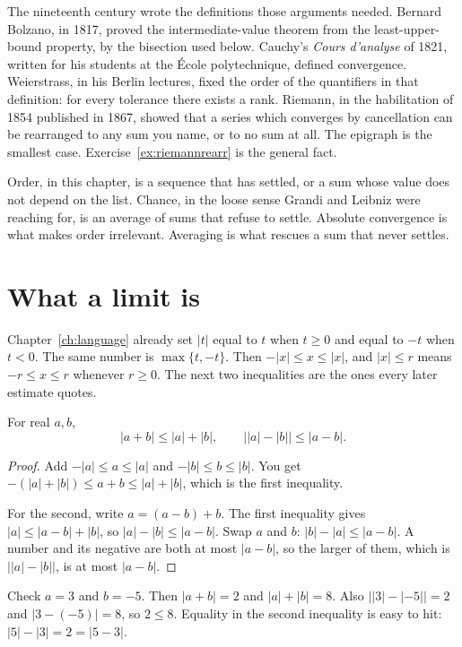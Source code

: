 The nineteenth century wrote the definitions those arguments needed. Bernard Bolzano, in 1817, proved the intermediate-value theorem from the least-upper-bound property, by the bisection used below. Cauchy's \emph{Cours d'analyse} of 1821, written for his students at the \'Ecole polytechnique, defined convergence. Weierstrass, in his Berlin lectures, fixed the order of the quantifiers in that definition: for every tolerance there exists a rank. Riemann, in the habilitation of 1854 published in 1867, showed that a series which converges by cancellation can be rearranged to any sum you name, or to no sum at all. The epigraph is the smallest case. Exercise~\ref{ex:riemannrearr} is the general fact.

Order, in this chapter, is a sequence that has settled, or a sum whose value does not depend on the list. Chance, in the loose sense Grandi and Leibniz were reaching for, is an average of sums that refuse to settle. Absolute convergence is what makes order irrelevant. Averaging is what rescues a sum that never settles.

\section{What a limit is}

Chapter~\ref{ch:language} already set $|t|$ equal to $t$ when $t\ge0$ and equal to $-t$ when $t<0$. The same number is $\max\{t,-t\}$. Then $-|x|\le x\le|x|$, and $|x|\le r$ means $-r\le x\le r$ whenever $r\ge0$. The next two inequalities are the ones every later estimate quotes.

\begin{proposition}\label{prop:real-triangle}
For real $a,b$,
\[
|a+b|\le|a|+|b|,\qquad \bigl||a|-|b|\bigr|\le|a-b|.
\]
\end{proposition}
\begin{proof}
Add $-|a|\le a\le|a|$ and $-|b|\le b\le|b|$. You get $-(|a|+|b|)\le a+b\le|a|+|b|$, which is the first inequality.

For the second, write $a=(a-b)+b$. The first inequality gives $|a|\le|a-b|+|b|$, so $|a|-|b|\le|a-b|$. Swap $a$ and $b$: $|b|-|a|\le|a-b|$. A number and its negative are both at most $|a-b|$, so the larger of them, which is $\bigl||a|-|b|\bigr|$, is at most $|a-b|$.
\end{proof}

Check $a=3$ and $b=-5$. Then $|a+b|=2$ and $|a|+|b|=8$. Also $\bigl||3|-|{-5}|\bigr|=2$ and $|3-(-5)|=8$, so $2\le8$. Equality in the second inequality is easy to hit: $|5|-|3|=2=|5-3|$.

